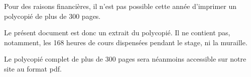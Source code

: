 










\LARGE  
Pour des raisons financières, il n'est pas possible cette année d'imprimer un polycopié de plus de 300 pages. 

\bigskip

Le présent document est donc un extrait du polycopié. Il ne contient pas, notamment, les 168 heures de cours dispensées pendant le stage, ni la muraille.

\bigskip

Le polycopié complet de plus de 300 pages sera néanmoins accessible sur notre site au format pdf.




\newpage